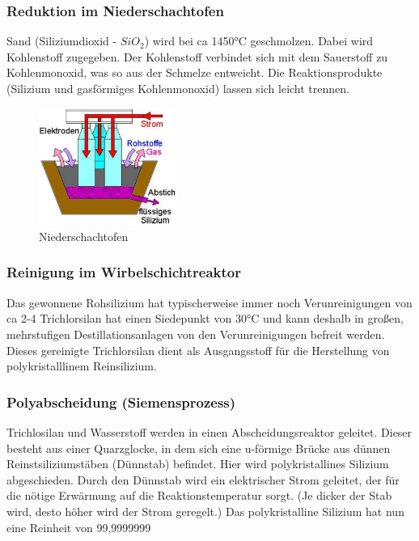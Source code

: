 	\subsubsection{Reduktion im Niederschachtofen}
		Sand (Siliziumdioxid - $SiO_2$) wird bei ca 1450°C geschmolzen. Dabei wird Kohlenstoff zugegeben. Der Kohlenstoff verbindet sich mit dem Sauerstoff zu Kohlenmonoxid, was so aus der Schmelze entweicht. Die Reaktionsprodukte (Silizium und gasförmiges Kohlenmonoxid) lassen sich leicht trennen.
		\begin{figure}[h!]
			\centering
			\includegraphics[width=0.4\textwidth]{Kapitel/Kap02/niederschachtofen.PNG}
			\caption{Niederschachtofen}
			\label{02_niederschachtofen}
		\end{figure}
		
	\subsubsection{Reinigung im Wirbelschichtreaktor}
		Das gewonnene Rohsilizium hat typischerweise immer noch Verunreinigungen von ca 2-4%
		Trichlorsilan hat einen Siedepunkt von 30°C und kann deshalb in großen, mehrstufigen Destillationsanlagen von den Verunreinigungen befreit werden. Dieses gereinigte Trichlorsilan dient als Ausgangsstoff für die Herstellung von polykristalllinem Reinsilizium.
		
	\subsubsection{Polyabscheidung (Siemensprozess)}
		Trichlosilan und Wasserstoff werden in einen Abscheidungsreaktor geleitet. Dieser besteht aus einer Quarzglocke, in dem sich eine u-förmige Brücke aus dünnen Reinstsiliziumstäben (Dünnstab) befindet. Hier wird polykristallines Silizium abgeschieden. Durch den Dünnstab wird ein elektrischer Strom geleitet, der für die nötige Erwärmung auf die Reaktionstemperatur sorgt. (Je dicker der Stab wird, desto höher wird der Strom geregelt.) Das polykristalline Silizium hat nun eine Reinheit von 99,9999999%
